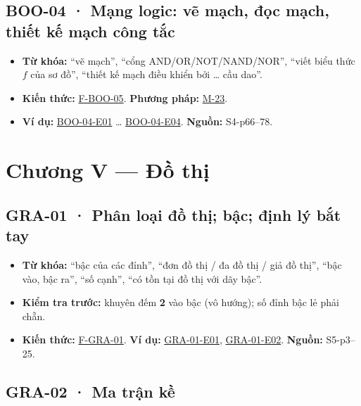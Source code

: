 \documentclass[
  10pt,
  twoside,openany]{book}
\providecommand{\tightlist}{%
  \setlength{\itemsep}{0pt}\setlength{\parskip}{0pt}}
\begin{document}
\hypertarget{BOO-04}{%
\subsection{BOO-04 · Mạng logic: vẽ mạch, đọc mạch, thiết kế mạch công
tắc}\label{BOO-04}}

\begin{itemize}
\tightlist
\item
  \textbf{Từ khóa:} ``vẽ mạch'', ``cổng AND/OR/NOT/NAND/NOR'', ``viết
  biểu thức \(f\) của sơ đồ'', ``thiết kế mạch điều khiển bởi \ldots{}
  cầu dao''.
\item
  \textbf{Kiến thức:} \protect\hyperlink{F-BOO-05}{F-BOO-05}.
  \textbf{Phương pháp:} \protect\hyperlink{M-23}{M-23}.
\item
  \textbf{Ví dụ:} \protect\hyperlink{BOO-04-E01}{BOO-04-E01} \ldots{}
  \protect\hyperlink{BOO-04-E04}{BOO-04-E04}. \textbf{Nguồn:}
  S4-p66--78.
\end{itemize}

\hypertarget{chux1b0ux1a1ng-v-ux111ux1ed3-thux1ecb}{%
\section{Chương V --- Đồ
thị}\label{chux1b0ux1a1ng-v-ux111ux1ed3-thux1ecb}}

\hypertarget{GRA-01}{%
\subsection{GRA-01 · Phân loại đồ thị; bậc; định lý bắt
tay}\label{GRA-01}}

\begin{itemize}
\tightlist
\item
  \textbf{Từ khóa:} ``bậc của các đỉnh'', ``đơn đồ thị / đa đồ thị / giả
  đồ thị'', ``bậc vào, bậc ra'', ``số cạnh'', ``có tồn tại đồ thị với
  dãy bậc''.
\item
  \textbf{Kiểm tra trước:} khuyên đếm \textbf{2} vào bậc (vô hướng); số
  đỉnh bậc lẻ phải chẵn.
\item
  \textbf{Kiến thức:} \protect\hyperlink{F-GRA-01}{F-GRA-01}. \textbf{Ví
  dụ:} \protect\hyperlink{GRA-01-E01}{GRA-01-E01},
  \protect\hyperlink{GRA-01-E02}{GRA-01-E02}. \textbf{Nguồn:} S5-p3--25.
\end{itemize}

\hypertarget{GRA-02}{%
\subsection{GRA-02 · Ma trận kề}\label{GRA-02}}
\end{document}
